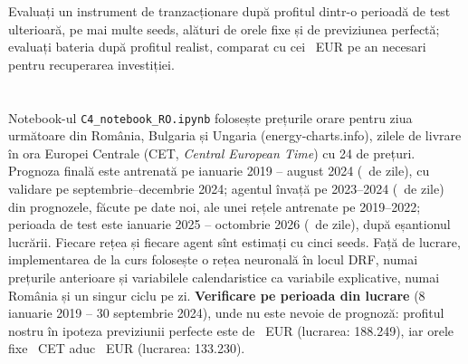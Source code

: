 \begin{decision}
%
{Evaluați un instrument de tranzacționare după profitul dintr-o perioadă de test ulterioară, pe mai multe seeds, alături de orele fixe și de previziunea perfectă; evaluați bateria după profitul realist, comparat cu cei \Nneed\ EUR pe an necesari pentru recuperarea investiției.}
\end{decision}

\section{}
%
{Notebook-ul \texttt{C4\_notebook\_RO.ipynb} folosește prețurile orare pentru ziua următoare din România, Bulgaria și Ungaria (energy-charts.info), zilele de livrare în ora Europei Centrale (CET, \emph{Central European Time}) cu 24 de prețuri.
Prognoza finală este antrenată pe ianuarie 2019 -- august 2024 (\NnTrainTwo\ de zile), cu validare pe septembrie--decembrie 2024; agentul învață pe 2023--2024 (\NnAgentDays\ de zile) din prognozele, făcute pe date noi, ale unei rețele antrenate pe 2019--2022; perioada de test este ianuarie 2025 -- octombrie 2026 (\NnTest\ de zile), după eșantionul lucrării. Fiecare rețea și fiecare agent sînt estimați cu cinci seeds.
Față de lucrare, implementarea de la curs folosește o rețea neuronală în locul DRF, numai prețurile anterioare și variabilele calendaristice ca variabile explicative, numai România și un singur ciclu pe zi.
\textbf{Verificare pe perioada din lucrare} (8 ianuarie 2019 -- 30 septembrie 2024), unde nu este nevoie de prognoză: profitul nostru în ipoteza previziunii perfecte este de \NpfW\ EUR (lucrarea: 188.249), iar orele fixe \NnhWPair\ CET aduc \NnhW\ EUR (lucrarea: 133.230).}

